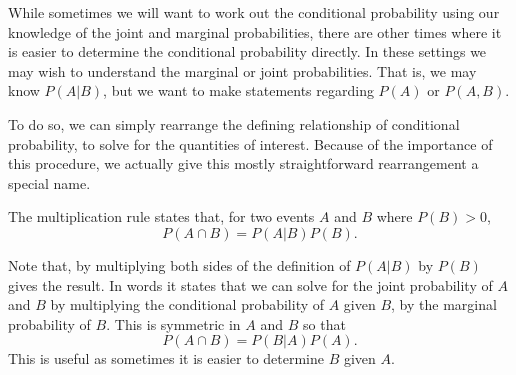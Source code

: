 \documentclass[
  letterpaper,
  DIV=11,
  numbers=noendperiod]{scrreprt}
\theoremstyle{definition}
\theoremstyle{definition}
\theoremstyle{definition}
\theoremstyle{remark}
\begin{document}
While sometimes we will want to work out the conditional probability
using our knowledge of the joint and marginal probabilities, there are
other times where it is easier to determine the conditional probability
directly. In these settings we may wish to understand the marginal or
joint probabilities. That is, we may know \(P(A|B)\), but we want to
make statements regarding \(P(A)\) or \(P(A,B)\).

To do so, we can simply rearrange the defining relationship of
conditional probability, to solve for the quantities of interest.
Because of the importance of this procedure, we actually give this
mostly straightforward rearrangement a special name.

\begin{tcolorbox}[enhanced jigsaw, rightrule=.15mm, leftrule=.75mm, opacitybacktitle=0.6, title={Multiplication Rule}, colframe=quarto-callout-tip-color-frame, opacityback=0, coltitle=black, breakable, toptitle=1mm, colbacktitle=quarto-callout-tip-color!10!white, bottomtitle=1mm, titlerule=0mm, arc=.35mm, colback=white, toprule=.15mm, left=2mm, bottomrule=.15mm]

The multiplication rule states that, for two events \(A\) and \(B\)
where \(P(B) > 0\), \[P(A\cap B) = P(A|B)P(B).\]

\end{tcolorbox}

Note that, by multiplying both sides of the definition of \(P(A|B)\) by
\(P(B)\) gives the result. In words it states that we can solve for the
joint probability of \(A\) and \(B\) by multiplying the conditional
probability of \(A\) given \(B\), by the marginal probability of \(B\).
This is symmetric in \(A\) and \(B\) so that
\[P(A\cap B) = P(B|A)P(A).\] This is useful as sometimes it is easier to
determine \(B\) given \(A\).
\end{document}
